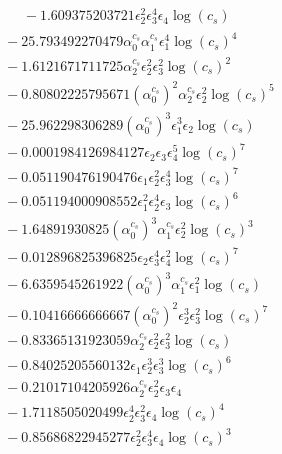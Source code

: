 \documentclass[10pt]{article}
\begin{document}
\begin{align*}
\phantom{F_{s,7}} &\phantom{={}}{}  - 1.609375203721 \epsilon_{2}^{2} \epsilon_{3}^{4} \epsilon_{4} \log{\left(c_{s} \right)} \\
&{}  - 25.793492270479 \alpha_{0}^{c_s} \alpha_{1}^{c_s} \epsilon_{1}^{4} \log{\left(c_{s} \right)}^{4} \\
&{}  - 1.6121671711725 \alpha_{2}^{c_s} \epsilon_{2}^{2} \epsilon_{3}^{2} \log{\left(c_{s} \right)}^{2} \\
&{}  - 0.80802225795671 \left(\alpha_{0}^{c_s}\right)^{2} \alpha_{2}^{c_s} \epsilon_{2}^{2} \log{\left(c_{s} \right)}^{5} \\
&{}  - 25.962298306289 \left(\alpha_{0}^{c_s}\right)^{3} \epsilon_{1}^{3} \epsilon_{2} \log{\left(c_{s} \right)} \\
&{}  - 0.0001984126984127 \epsilon_{2} \epsilon_{3} \epsilon_{4}^{5} \log{\left(c_{s} \right)}^{7} \\
&{}  - 0.051190476190476 \epsilon_{1} \epsilon_{2}^{2} \epsilon_{3}^{4} \log{\left(c_{s} \right)}^{7} \\
&{}  - 0.051194000908552 \epsilon_{1}^{2} \epsilon_{2}^{4} \epsilon_{3} \log{\left(c_{s} \right)}^{6} \\
&{}  - 1.64891930825 \left(\alpha_{0}^{c_s}\right)^{3} \alpha_{1}^{c_s} \epsilon_{2}^{2} \log{\left(c_{s} \right)}^{3} \\
&{}  - 0.012896825396825 \epsilon_{2} \epsilon_{3}^{4} \epsilon_{4}^{2} \log{\left(c_{s} \right)}^{7} \\
&{}  - 6.6359545261922 \left(\alpha_{0}^{c_s}\right)^{3} \alpha_{1}^{c_s} \epsilon_{1}^{2} \log{\left(c_{s} \right)} \\
&{}  - 0.10416666666667 \left(\alpha_{0}^{c_s}\right)^{2} \epsilon_{2}^{3} \epsilon_{3}^{2} \log{\left(c_{s} \right)}^{7} \\
&{}  - 0.83365131923059 \alpha_{2}^{c_s} \epsilon_{2}^{2} \epsilon_{3}^{2} \log{\left(c_{s} \right)} \\
&{}  - 0.84025205560132 \epsilon_{1} \epsilon_{2}^{3} \epsilon_{3}^{3} \log{\left(c_{s} \right)}^{6} \\
&{}  - 0.21017104205926 \alpha_{2}^{c_s} \epsilon_{2}^{2} \epsilon_{3} \epsilon_{4} \\
&{}  - 1.7118505020499 \epsilon_{2}^{4} \epsilon_{3}^{2} \epsilon_{4} \log{\left(c_{s} \right)}^{4} \\
&{}  - 0.85686822945277 \epsilon_{2}^{2} \epsilon_{3}^{4} \epsilon_{4} \log{\left(c_{s} \right)}^{3} \\

\end{align*}
\end{document}
